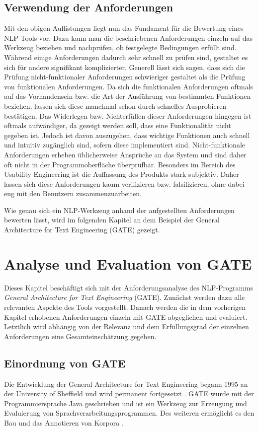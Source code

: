 \documentclass[12pt]{report}
\begin{document}
\section{Verwendung der Anforderungen}
Mit den obigen Auflistungen liegt nun das Fundament für die Bewertung eines NLP-Tools vor. Dazu kann man die beschriebenen Anforderungen einzeln auf das Werkzeug beziehen und nachprüfen, ob festgelegte Bedingungen erfüllt sind. Während einige Anforderungen dadurch sehr schnell zu prüfen sind, gestaltet es sich für andere signifikant komplizierter. Generell lässt sich sagen, dass sich die Prüfung nicht-funktionaler Anforderungen schwieriger gestaltet als die Prüfung von funktionalen Anforderungen\cite{bal98}. Da sich die funktionalen Anforderungen oftmals auf das Vorhandensein bzw. die Art der Ausführung von bestimmten Funktionen beziehen, lassen sich diese manchmal schon durch schnelles Ausprobieren bestätigen. Das Widerlegen bzw. Nichterfüllen dieser Anforderungen hingegen ist oftmals aufwändiger, da gezeigt werden soll, dass eine Funktionalität nicht gegeben ist. Jedoch ist davon auszugehen, dass wichtige Funktionen auch schnell und intuitiv zugänglich sind, sofern diese implementiert sind. 
Nicht-funktionale Anforderungen erheben üblicherweise Ansprüche an das System und sind daher oft nicht in der Programmoberfläche überprüfbar. Besonders im Bereich des Usability Engineering ist die Auffassung des Produkts stark subjektiv. Daher lassen sich diese Anforderungen kaum verifizieren bzw. falsifizieren, ohne dabei eng mit den Benutzern zusammenzuarbeiten. 

Wie genau sich ein NLP-Werkzeug anhand der aufgestellten Anforderungen bewerten lässt, wird im folgenden Kapitel an dem Beispiel der General Architecture for Text Engineering (GATE) gezeigt. 

\chapter{Analyse und Evaluation von GATE}
Dieses Kapitel beschäftigt sich mit der Anforderungsanalyse des NLP-Programms \textit{General Architecture for Text Engineering} (GATE). Zunächst werden dazu alle relevanten Aspekte des Tools vorgestellt. Danach werden die in dem vorherigen Kapitel erhobenen Anforderungen einzeln mit GATE abgeglichen und evaluiert. Letztlich wird abhängig von der Relevanz und dem Erfüllungsgrad der einzelnen Anforderungen eine Gesamteinschätzung gegeben.

\section{Einordnung von GATE}
Die Entwicklung der General Architecture for Text Engineering begann 1995 an der University of Sheffield und wird permanent fortgesetzt \cite{cgw95}. GATE wurde mit der Programmiersprache Java geschrieben  und ist ein Werkzeug zur Erzeugung und Evaluierung von Sprachverarbeitungsprogrammen. Des weiteren ermöglicht es den Bau und das Annotieren von Korpora \cite{cmb02}. 
\end{document}
